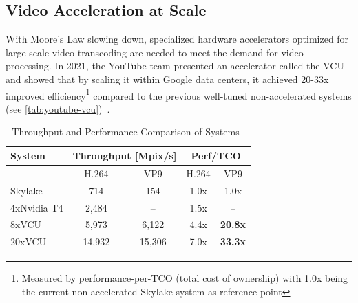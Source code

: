 \subsection{Video Acceleration at Scale}

With Moore's Law slowing down, specialized hardware accelerators optimized for large-scale video transcoding are needed to meet the demand for video processing. 
In 2021, the YouTube team presented an accelerator called the \ac{VCU} and showed that by scaling it within Google data centers, it achieved 20-33x improved efficiency\footnote{Measured by performance-per-TCO (total cost of ownership) with 1.0x being the current non-accelerated Skylake system as reference point} compared to the previous well-tuned non-accelerated systems (see \autoref{tab:youtube-vcu})~\parencite{youtube_infrastructure}.

\begin{table}[h!]
\centering
\caption{Throughput and Performance Comparison of Systems~\parencite{youtube_vpu}}\label{tab:youtube-vcu}
\begin{tabular}{|l|cc|cc|}
\hline
\textbf{System}      & \multicolumn{2}{c|}{\textbf{Throughput [Mpix/s]}} & \multicolumn{2}{c|}{\textbf{Perf/TCO}}    \\ \hline
            & \multicolumn{1}{c|}{H.264}       & VP9       & \multicolumn{1}{c|}{H.264} & VP9 \\ \hline
Skylake     & \multicolumn{1}{c|}{714}            & 154           & \multicolumn{1}{c|}{1.0x}      & 1.0x     \\ \hline
4xNvidia T4 & \multicolumn{1}{c|}{2,484}          & --            & \multicolumn{1}{c|}{1.5x}      & --       \\ \hline
8xVCU       & \multicolumn{1}{c|}{5,973}          & 6,122         & \multicolumn{1}{c|}{4.4x}      & \textbf{20.8x}    \\ \hline
20xVCU      & \multicolumn{1}{c|}{14,932}         & 15,306        & \multicolumn{1}{c|}{7.0x}      & \textbf{33.3x}    \\ \hline
\end{tabular}
\end{table}

